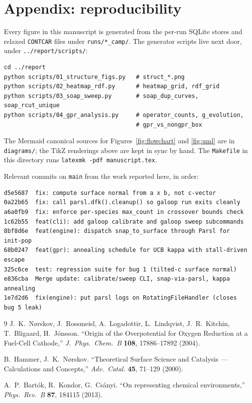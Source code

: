 \documentclass[11pt,letterpaper]{article}
\begin{document}
\appendix
\section{Appendix: reproducibility}

Every figure in this manuscript is generated from the per-run SQLite
stores and relaxed \texttt{CONTCAR} files under
\texttt{runs/*\_camp/}. The generator scripts live next door, under
\texttt{../report/scripts/}:

\begin{verbatim}
cd ../report
python scripts/01_structure_figs.py   # struct_*.png
python scripts/02_heatmap_rdf.py      # heatmap_grid, rdf_grid
python scripts/03_soap_sweep.py       # soap_dup_curves, soap_rcut_unique
python scripts/04_gpr_analysis.py     # operator_counts, g_evolution,
                                      # gpr_vs_nongpr_box
\end{verbatim}

The Mermaid canonical sources for Figures~\ref{fig:flowchart} and
\ref{fig:uml} are in \texttt{diagrams/}; the TikZ renderings above
are kept in sync by hand. The \texttt{Makefile} in this directory
runs \texttt{latexmk -pdf manuscript.tex}.

Relevant commits on \texttt{main} from the work reported here, in
order:

\begin{verbatim}
d5e5687  fix: compute surface normal from a x b, not c-vector
0a22b65  fix: call parsl.dfk().cleanup() so galoop run exits cleanly
a6a0fb9  fix: enforce per-species max_count in crossover bounds check
1c62b55  feat(cli): add galoop calibrate and galoop sweep subcommands
8bf8d6e  feat(engine): dispatch snap_to_surface through Parsl for init-pop
68b0247  feat(gpr): annealing schedule for UCB kappa with stall-driven escape
325c6ce  test: regression suite for bug 1 (tilted-c surface normal)
e836cba  Merge update: calibrate/sweep CLI, snap-via-parsl, kappa annealing
1e7d2d6  fix(engine): put parsl logs on RotatingFileHandler (closes bug 5 leak)
\end{verbatim}

\nocite{norskov2004che,hammer2000,bartok2013soap}

\begin{thebibliography}{9}
J.~K.~N{\o}rskov, J.~Rossmeisl, A.~Logadottir, L.~Lindqvist, J.~R.~Kitchin, T.~Bligaard, H.~J{\'o}nsson.
``Origin of the Overpotential for Oxygen Reduction at a Fuel-Cell Cathode,''
\emph{J.~Phys.~Chem.~B} \textbf{108}, 17886--17892 (2004).

B.~Hammer, J.~K.~N{\o}rskov.
``Theoretical Surface Science and Catalysis — Calculations and Concepts,''
\emph{Adv.~Catal.} \textbf{45}, 71--129 (2000).

A.~P.~Bart{\'o}k, R.~Kondor, G.~Cs{\'a}nyi.
``On representing chemical environments,''
\emph{Phys.~Rev.~B} \textbf{87}, 184115 (2013).
\end{thebibliography}
\end{document}

